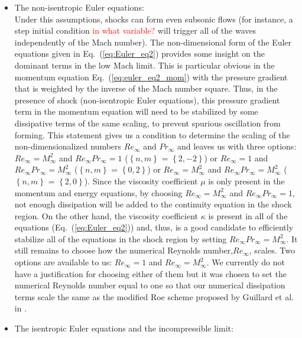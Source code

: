 \documentclass[preprint,10pt]{elsarticle}
\newcommand{\eqt}[1]{Eq.~(\ref{#1})}                     %
\newcommand{\tcr}[1]{\textcolor{red}{#1}}
\begin{document}
\begin{itemize}
\item The non-isentropic Euler equations:\\
Under this assumptions, shocks can form even subsonic flows (for instance, a step initial condition \tcr{in what variable?} will trigger all of the waves independently of the Mach number). The non-dimensional form of the Euler equations given in \eqt{eq:Euler_eq2} provides some insight on the dominant terms in the low Mach limit. This is particular obvious in the momentum equation \eqt{eq:euler_eq2_mom} with the pressure gradient that is weighted by the inverse of the Mach number square. Thus, in the presence of shock (non-isentropic Euler equations), this pressure gradient term in the momentum equation will need to be stabilized by some dissipative terms of the same scaling, to prevent spurious oscillation from forming. This statement gives us a condition to determine the scaling of the non-dimensionalized numbers $Re_\infty$ and $Pr_\infty$ and leaves us with three options: $Re_\infty = M_\infty^2$ and $Re_\infty Pr_\infty = 1$ ($\left\{ n,m \right\}$ = $\left\{ 2, -2 \right\}$) or $Re_\infty = 1$ and $Re_\infty Pr_\infty = M_\infty^2$ ($\left\{ n,m \right\}$ = $\left\{ 0, 2 \right\}$) or $Re_\infty = M_\infty^2$ and $Re_\infty Pr_\infty = M_\infty^2$ ($\left\{ n,m \right\}$ = $\left\{ 2, 0 \right\}$). Since the viscosity coefficient $\mu$ is only present in the momentum and energy equations, by choosing $Re_\infty = M_\infty^2$ and $Re_\infty Pr_\infty = 1$, not enough dissipation will be added to the continuity equation in the shock region. On the other hand, the viscosity coefficient $\kappa$ is present in all of the equations (\eqt{eq:Euler_eq2}) and, thus, is a good candidate to efficiently stabilize all of the equations in the shock region by setting $Re_\infty Pr_\infty = M_\infty^2$. It still remains to choose how the numerical Reynolds number,$Re_\infty$, scales. Two options are available to us: $Re_\infty=1$ and $Re_\infty=M_\infty^2$. We currently do not have a justification for choosing either of them but it was chosen to set the numerical Reynolds number equal to one so that our numerical dissipation terms scale the same as the modified Roe scheme proposed by Guillard et al. in \cite{LowMach1}.
\item The isentropic Euler equations and the incompressible limit:\\

\end{itemize}
\end{document}
